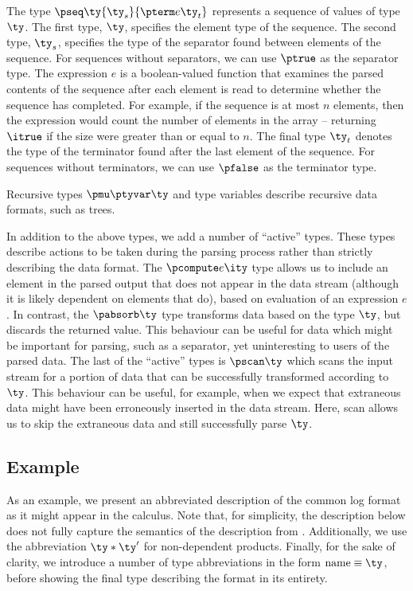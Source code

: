 The type $\pseq \ty {\ty_s} {\pterm e {\ty_t}}$ represents a sequence
of values of type $\ty$. The first type, $\ty$, specifies
the element type of the sequence. The second type, $\ty_s$, specifies
the type of the separator found between elements of the sequence. For
sequences without separators, we can use $\ptrue$ as the separator
type.  The expression $e$ is a boolean-valued function that examines
the parsed contents of the sequence after each element is read to
determine whether the sequence has completed. For example, if the
sequence is at most $n$ elements, then the expression would count the
number of elements in the array -- returning $\itrue$ if the size were
greater than or equal to $n$.  The final type $\ty_t$ denotes the type of the terminator found after the last element of the sequence.  For sequences without terminators, we can use $\pfalse$ as the terminator type.

Recursive types $\pmu \ptyvar \ty$ and type variables describe
recursive data formats, such as trees.

In addition to the above types, we add a number of ``active'' types.
These types describe actions to be taken during the parsing process
rather than strictly describing the data format. The $\pcompute e
\ity$ type allows us to include an element in the parsed output that
does not appear in the data stream (although it is likely dependent on
elements that do), based on evaluation of an expression $e$.  In
contrast, the $\pabsorb \ty$ type transforms data based on the type
$\ty$, but discards the returned value. This behaviour can be useful
for data which might be important for parsing, such as a separator,
yet uninteresting to users of the parsed data. The last of the
``active'' types is $\pscan \ty$ which scans the input stream for a
portion of data that can be successfully transformed according to
$\ty$. This behaviour can be useful, for example, when we expect that
extraneous data might have been erroneously inserted in the data
stream. Here, scan allows us to skip the extraneous data and still
successfully parse $\ty$.

\subsection{Example}

As an example, we present an abbreviated description of the common log
format as it might appear in the calculus. Note that, for simplicity,
the description below does not fully capture the semantics of the
\ipads{} description from . Additionally, we
use the abbreviation $\ty * \ty'$ for non-dependent products. Finally,
for the sake of clarity, we introduce a number of type abbreviations
in the form $\mathrm{name} \equiv \ty$, before showing the final type
describing the format in its entirety.

